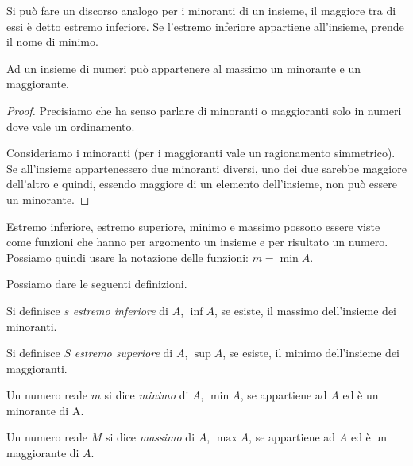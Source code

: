 Si può fare un discorso analogo per i minoranti di un insieme, 
il maggiore tra di essi è detto estremo inferiore. 
Se l'estremo inferiore appartiene all'insieme, prende il nome di minimo. 

\begin{newtheo}{}{}
Ad un insieme di numeri può appartenere al massimo un minorante e un 
maggiorante.
\end{newtheo}
\begin{proof}
Precisiamo che ha senso parlare di minoranti o maggioranti solo in numeri 
dove vale un ordinamento.

Consideriamo i minoranti (per i maggioranti vale un ragionamento 
simmetrico).
Se all'insieme appartenessero due minoranti diversi, uno dei due sarebbe 
maggiore dell'altro e quindi, essendo maggiore di un elemento dell'insieme, 
non può essere un minorante.
\end{proof}
\begin{newoss}
Estremo inferiore, estremo superiore, minimo e massimo possono essere viste 
come funzioni che hanno per argomento un insieme e per risultato un numero.
Possiamo quindi usare la notazione delle funzioni: \quad \(m = \min{A}\).
\end{newoss}

Possiamo dare le seguenti definizioni.

\begin{newdef}{}{}
Si definisce \(s\) \emph{estremo inferiore} di \(A\), \(\inf{A}\), se 
esiste, il massimo dell'insieme dei minoranti.
\end{newdef}

\begin{newdef}{}{}
Si definisce \(S\) \emph{estremo superiore} di \(A\), \(\sup{A}\), se 
esiste, il minimo dell'insieme dei maggioranti.
\end{newdef}

\begin{newdef}{}{}
Un numero reale \(m\) si dice \emph{minimo} di \(A\), \(\min{A}\), se 
appartiene ad \(A\) ed è un minorante di A.
\end{newdef}

\begin{newdef}{}{}
Un numero reale \(M\) si dice \emph{massimo} di \(A\), \(\max{A}\), se 
appartiene ad \(A\) ed è un maggiorante di \(A\).
\end{newdef}


